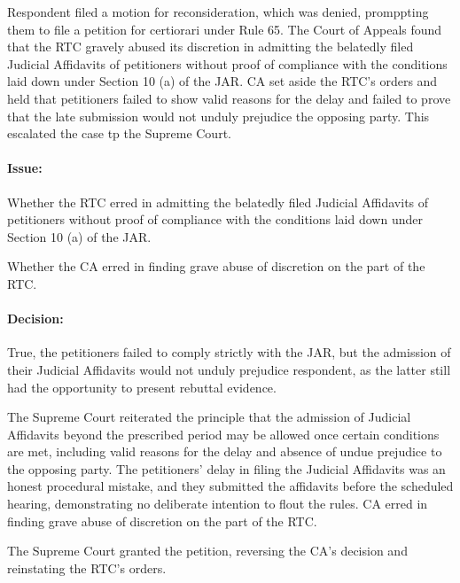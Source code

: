 \documentclass[
12pt,
oneside,
onehalfspacing,
headsepline
]{DigestCollection}
\begin{document}
Respondent filed a motion for reconsideration, which was denied, promppting them to file a petition for certiorari under Rule 65. The Court of Appeals found that the RTC gravely abused its discretion in admitting the belatedly filed Judicial Affidavits of petitioners without proof of compliance with the conditions laid down under Section 10 (a) of the JAR. CA set aside the RTC's orders and held that petitioners failed to show valid reasons for the delay and failed to prove that the late submission would not unduly prejudice the opposing party. This escalated the case tp the Supreme Court.

\paragraph{Issue:}
\label{bb610560-0f9b-11ef-892d-31fd918e73ca}


Whether the RTC erred in admitting the belatedly filed Judicial Affidavits of petitioners without proof of compliance with the conditions laid down under Section 10 (a) of the JAR.

Whether the CA erred in finding grave abuse of discretion on the part of the RTC.

\paragraph{Decision:}
\label{b82e6310-0f9b-11ef-892d-31fd918e73ca}


True, the petitioners failed to comply strictly with the JAR, but the admission of their Judicial Affidavits would not unduly prejudice respondent, as the latter still had the opportunity to present rebuttal evidence.

The Supreme Court reiterated the principle that the admission of Judicial Affidavits beyond the prescribed period may be allowed once certain conditions are met, including valid reasons for the delay and absence of undue prejudice to the opposing party. The petitioners' delay in filing the Judicial Affidavits was an honest procedural mistake, and they submitted the affidavits before the scheduled hearing, demonstrating no deliberate intention to flout the rules. CA erred in finding grave abuse of discretion on the part of the RTC.

The Supreme Court granted the petition, reversing the CA's decision and reinstating the RTC's orders.

\label{79f80c40-0a2d-11ef-a1a5-03b0bde1fccf}
\end{document}
